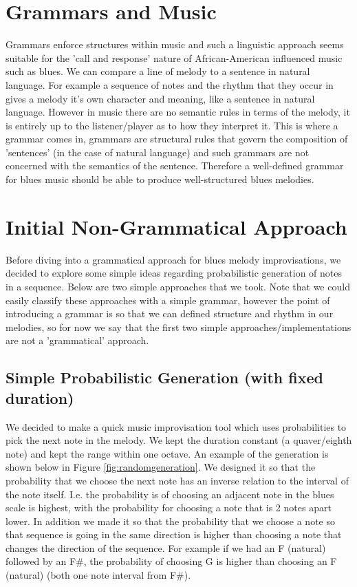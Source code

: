 \documentclass[pdftex,12pt,a4paper]{report}
\begin{document}
\section{Grammars and Music}
Grammars enforce structures within music and such a linguistic approach seems suitable for the 'call and response' nature of African-American influenced music such as blues. We can compare a line of melody to a sentence in natural language. For example a sequence of notes and the rhythm that they occur in gives a melody it's own character and meaning, like a sentence in natural language. However in music there are no semantic rules in terms of the melody, it is entirely up to the listener/player as to how they interpret it. This is where a grammar comes in, grammars are structural rules that govern the composition of 'sentences' (in the case of natural language) and such grammars are not concerned with the semantics of the sentence. Therefore a well-defined grammar for blues music should be able to produce well-structured blues melodies.


\section{Initial Non-Grammatical Approach}
Before diving into a grammatical approach for blues melody improvisations, we decided to explore some simple ideas regarding probabilistic generation of notes in a sequence. Below are two simple approaches that we took. Note that we could easily classify these approaches with a simple grammar, however the point of introducing a grammar is so that we can defined structure and rhythm in our melodies, so for now we say that the first two simple approaches/implementations are not a 'grammatical' approach.

\subsection{Simple Probabilistic Generation (with fixed duration)}
We decided to make a quick music improvisation tool which uses probabilities to pick the next note in the melody. We kept the duration constant (a quaver/eighth note) and kept the range within one octave. An example of the generation is shown below in Figure \ref{fig:randomgeneration}. We designed it so that the probability that we choose the next note has an inverse relation to the interval of the note itself. I.e. the probability is of choosing an adjacent note in the blues scale is highest, with the probability for choosing a note that is 2 notes apart lower. In addition we made it so that the probability that we choose a note so that sequence is going in the same direction is higher than choosing a note that changes the direction of the sequence. For example if we had an F (natural) followed by an F\#, the probability of choosing G is higher than choosing an F (natural) (both one note interval from F\#).
\end{document}
